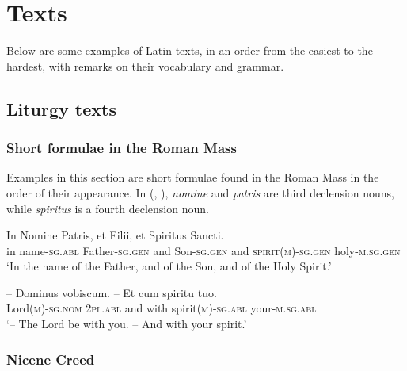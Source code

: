 \documentclass[a4paper, oneside, 12pt]{report}
\newcommand{\form}[1]{\emph{#1}}
\newcommand*{\category}[1]{\textsc{#1}}
\newcommand{\translate}[1]{`#1'}
\begin{document}
\chapter{Texts}

Below are some examples of Latin texts, 
in an order from the easiest to the hardest,
with remarks on their vocabulary and grammar. 

\section{Liturgy texts}

\subsection{Short formulae in the Roman Mass}

Examples in this section are short formulae found in the Roman Mass
in the order of their appearance.
In (, ),
\form{nomine} and \form{patris} are third declension nouns, 
while \form{spiritus} is a fourth declension noun. 

\begin{exe}
    \ex\label{ex:text.mass.1} \gll In Nomine Patris, et Filii, et Spiritus Sancti. \\
    in name-\category{sg}.\category{abl} Father-\category{sg}.\category{gen} 
    and Son-\category{sg}.\category{gen} 
    and \category{spirit}(\category{m})-\category{sg}.\category{gen}
    holy-\category{m}.\category{sg}.\category{gen} \\
    \glt \translate{In the name of the Father, and of the Son, and of the Holy Spirit.}

    \ex\label{ex:text.mass.2} \gll -- Dominus vobiscum. -- Et cum spiritu tuo. \\
    {} Lord(\category{m})-\category{sg}.\category{nom} 
    \category{2pl}.\category{abl} 
    {} and with spirit(\category{m})-\category{sg}.\category{abl} 
    your-\category{m}.\category{sg}.\category{abl} \\
    \glt \translate{-- The Lord be with you. -- And with your spirit.}
    
    \ex 
\end{exe}

\subsection{Nicene Creed}
\end{document}
